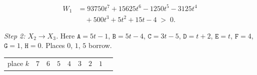 \documentclass[11pt,letterpaper]{article}
\theoremstyle{paperstyle}
\theoremstyle{paperstyledef}
\theoremstyle{paperstylerem}
\begin{document}
\[\begin{aligned}
W_1 &= 93750t^7 + 15625t^6 - 1250t^5 - 3125t^4\\
&\quad + 500t^3 + 5t^2 + 15t - 4 \;>\; 0.
\end{aligned}\]

\emph{Step 2: \(X_2 \to X_3\).} Here \(\mathtt{A} = 5t-1\), \(\mathtt{B} = 5t-4\), \(\mathtt{C} = 3t-5\), \(\mathtt{D} = t+2\), \(\mathtt{E} = t\), \(\mathtt{F} = 4\), \(\mathtt{G} = 1\), \(\mathtt{H} = 0\). Places \(0\), \(1\), \(5\) borrow.

{\def\LTcaptype{none} %
\begin{longtable}[]{@{}
  >{\raggedright\arraybackslash}p{}
  >{\raggedright\arraybackslash}p{}
  >{\raggedright\arraybackslash}p{}
  >{\raggedright\arraybackslash}p{}
  >{\raggedright\arraybackslash}p{}
  >{\raggedright\arraybackslash}p{}
  >{\raggedright\arraybackslash}p{}
  >{\raggedright\arraybackslash}p{}
  >{\raggedright\arraybackslash}p{}@{}}
\toprule\noalign{}
\begin{minipage}[b]{\linewidth}\raggedright
place \(k\)
\end{minipage} & \begin{minipage}[b]{\linewidth}\raggedright
\(7\)
\end{minipage} & \begin{minipage}[b]{\linewidth}\raggedright
\(6\)
\end{minipage} & \begin{minipage}[b]{\linewidth}\raggedright
\(5\)
\end{minipage} & \begin{minipage}[b]{\linewidth}\raggedright
\(4\)
\end{minipage} & \begin{minipage}[b]{\linewidth}\raggedright
\(3\)
\end{minipage} & \begin{minipage}[b]{\linewidth}\raggedright
\(2\)
\end{minipage} & \begin{minipage}[b]{\linewidth}\raggedright
\(1\)
\end{minipage} & \begin{minipage}[b]{\linewidth}\raggedright

\end{minipage}
\end{longtable}}
\end{document}
